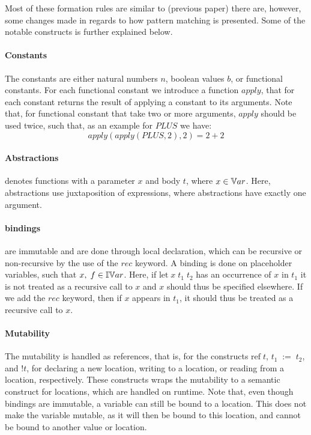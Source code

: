 \documentclass[../../master.tex]{subfiles}
\begin{document}
Most of these formation rules are similar to (previous paper) there are, however, some changes made in regards to how pattern matching is presented.
Some of the notable constructs is further explained below.

\paragraph{Constants}
The constants are either natural numbers $n$, boolean values $b$, or functional constants.
For each functional constant we introduce a function $apply$, that for each constant returns the result of applying a constant to its arguments.
Note that, for functional constant that take two or more arguments, $apply$ should be used twice, such that, as an example for $PLUS$ we have:
$$apply(apply(PLUS,2),2)=2+2$$

\paragraph{Abstractions}
denotes functions with a parameter $x$ and body $t$, where $x\in\mathbb{V}ar$.
Here, abstractions use juxtaposition of expressions, where abstractions have exactly one argument.

\paragraph{bindings}
are immutable and are done through local declaration, which can be recursive or non-recursive by the use of the $rec$ keyword.
A binding is done on placeholder variables, such that $x,\;f\in\mathbb{IV}ar$.
Here, if $\mbox{let}\;x\;t_1\;t_2$ has an occurrence of $x$ in $t_1$ it is not treated as a recursive call to $x$ and $x$ should thus be specified elsewhere.
If we add the $rec$ keyword, then if $x$ appears in $t_1$, it should thus be treated as a recursive call to $x$.

\paragraph{Mutability}
The mutability is handled as references, that is, for the constructs $\mbox{ref}\;t$, $t_1\;:=\;t_2$, and $!t$, for declaring a new location, writing to a location, or reading from a location, respectively.
These constructs wraps the mutability to a semantic construct for locations, which are handled on runtime.
Note that, even though bindings are immutable, a variable can still be bound to a location.
This does not make the variable mutable, as it will then be bound to this location, and cannot be bound to another value or location.
\end{document}
